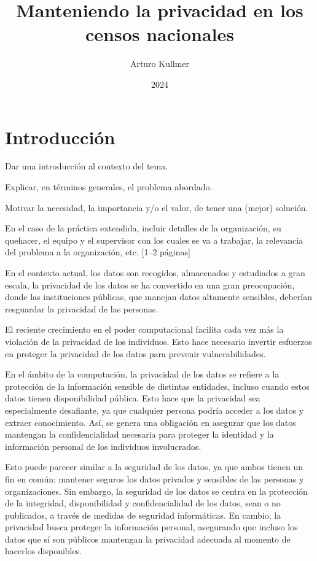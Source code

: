 \documentclass[informe]{upropuesta}
\title{Manteniendo la privacidad en los censos nacionales}
\author{Arturo Kullmer}
\date{2024}
\begin{document}
\maketitle

\section{Introducción}\label{sec:intro}

\begin{pauta}
Dar una introducción al contexto del tema.

Explicar, en términos generales, el problema abordado.

Motivar la necesidad, la importancia y/o el valor, de tener una (mejor) solución.

En el caso de la práctica extendida, incluir detalles de la organización, su quehacer, el equipo y el supervisor con los cuales se va a trabajar, la relevancia del problema a la organización, etc.
[1--2 páginas]
\end{pauta}

En el contexto actual, los datos son recogidos, almacenados y estudiados a gran escala, la privacidad de los datos se ha convertido en una gran preocupación, donde las instituciones públicas, que manejan datos altamente sensibles, deberían resguardar la privacidad de las personas.

El reciente crecimiento en el poder computacional facilita cada vez más la violación de la privacidad de los individuos. Esto hace necesario invertir esfuerzos en proteger la privacidad de los datos para prevenir vulnerabilidades.

En el ámbito de la computación, la privacidad de los datos se refiere a la protección de la información sensible de distintas entidades, incluso cuando estos datos tienen disponibilidad pública. Esto hace que la privacidad sea especialmente desafiante, ya que cualquier persona podría acceder a los datos y extraer conocimiento. Así, se genera una obligación en asegurar que los datos mantengan la confidencialidad necesaria para proteger la identidad y la información personal de los individuos involucrados.

Esto puede parecer similar a la seguridad de los datos, ya que ambos tienen un fin en común: mantener seguros los datos privados y sensibles de las personas y organizaciones. Sin embargo, la seguridad de los datos se centra en la protección de la integridad, disponibilidad y confidencialidad de los datos, sean o no publicados, a través de medidas de seguridad informáticas. En cambio, la privacidad busca proteger la información personal, asegurando que incluso los datos que sí son públicos mantengan la privacidad adecuada al momento de hacerlos disponibles.
\end{document}
